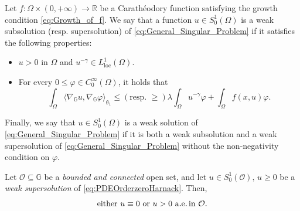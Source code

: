 \documentclass[10pt,a4paper]{amsart}
\begin{document}
\begin{defin}\label{def:weak_sub_super_sol}
	Let $f: \Omega \times (0,+\infty)\to \mathbb{R}$ be a Carath\'{e}odory function satisfying the growth condition \eqref{eq:Growth_of_f}. We say that a function $u \in S^{1}_{0}(\Omega)$ is a weak subsolution (resp. supersolution) of \eqref{eq:General_Singular_Problem} if it satisfies the following properties:
	\begin{itemize}
		\item[(i)] $u>0$ in $\Omega$ and $u^{-\gamma} \in L^{1}_{\textrm{loc}}(\Omega)$.
		\item[(ii)] For every $0\leq \varphi \in C^{\infty}_{0}(\Omega)$, it holds that
		\begin{equation}\label{eq:weak_sub_super_sol}
			\int_{\Omega}\langle \nabla_{\mathbb{G}}u, \nabla_{\mathbb{G}}\varphi \rangle_{\mathfrak{g}_{1}} \leq (\textrm{resp. } \geq) \lambda \int_{\Omega}u^{-\gamma}\varphi + \int_{\Omega}f(x,u)\varphi.
		\end{equation}
	\end{itemize}
	Finally, we say that $u \in S^{1}_{0}(\Omega)$ is a weak solution of \eqref{eq:General_Singular_Problem} if it is both a weak subsolution and a weak supersolution of \eqref{eq:General_Singular_Problem} without the non-negativity condition on $\varphi$.
\end{defin}

\begin{prop} \label{prop:SMP}
 Let $\mathcal{O}\subseteq \mathbb{G}$ be a \emph{bounded and connected} 
 open set, and let
 $u\in S^1_0(\mathcal{O}),\,u\geq 0$ be a \emph{weak supersolution} of \eqref{eq:PDEOrderzeroHarnack}. 
 Then,
 \begin{equation} \label{eq:SMPConclusion}
  \text{either $u \equiv 0$ or $u > 0$ a.e.\,in $\mathcal{O}$}.
 \end{equation}
\end{prop}
\end{document}

